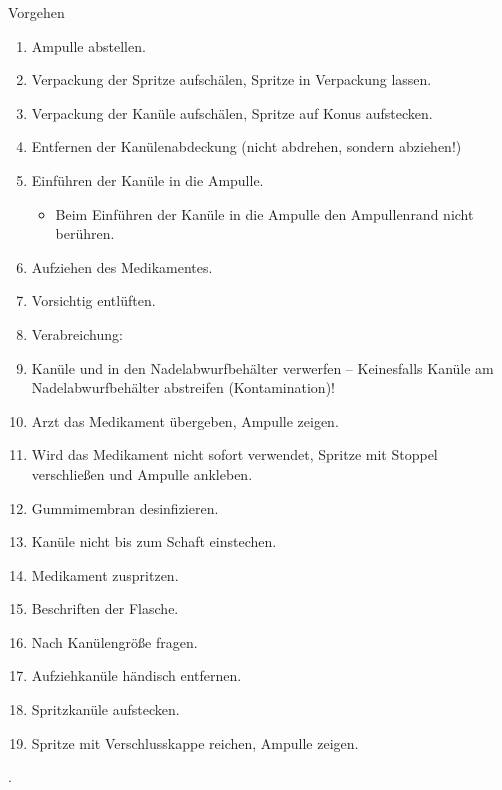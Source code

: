 \documentclass[
ngerman,
paper=a4,
asymmetric,
fontsize=10pt,
draft=false,
numbers=noenddot,
bibtotocnumbered,
footnotes=multiple,
]{scrreprt}
\newcommand{\jALTende}{\newline{\color{red}\rule{\linewidth}{2pt}\newline}}
\begin{document}
\begin{ProcedureStepsWide}{Vorgehen}
\begin{enumerate}
\begin{itemize}
   \end{itemize}
   \item Ampulle abstellen.
  \item Verpackung der Spritze aufschälen, Spritze in
   Verpackung lassen.
  \item Verpackung der Kanüle aufschälen, Spritze auf Konus
   aufstecken.
  \item Entfernen der Kanülenabdeckung (nicht abdrehen,
   sondern abziehen!)
  \item Einführen der Kanüle in die Ampulle.
  \begin{itemize}
    \item Beim Einführen der Kanüle in die Ampulle den
     Ampullenrand nicht berühren.
  \end{itemize}
  \item Aufziehen des
   Medikamentes.
  \item Vorsichtig entlüften.
   \item Verabreichung:
     \item Kanüle  und in den
    Nadelabwurfbehälter verwerfen -- Keinesfalls Kanüle am
    Nadelabwurfbehälter abstreifen (Kontamination)!
    \item Arzt das Medikament übergeben, Ampulle zeigen.
     \item Wird das Medikament nicht sofort verwendet, Spritze mit
    Stoppel verschließen und Ampulle ankleben.
     \item Gummimembran desinfizieren.
     \item Kanüle nicht bis zum Schaft einstechen.
     \item Medikament zuspritzen.
     \item Beschriften der Flasche.
    \item Nach Kanülengröße fragen.
    \item Aufziehkanüle händisch entfernen.
    \item Spritzkanüle aufstecken.
    \item Spritze mit Verschlusskappe reichen, Ampulle zeigen.
 \end{enumerate}
 \end{ProcedureStepsWide}
.
\jALTende
\end{document}
